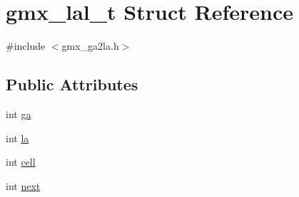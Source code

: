 \hypertarget{structgmx__lal__t}{\section{gmx\-\_\-lal\-\_\-t \-Struct \-Reference}
\label{structgmx__lal__t}
}


{\ttfamily \#include $<$gmx\-\_\-ga2la.\-h$>$}

\subsection*{\-Public \-Attributes}
\begin{DoxyCompactItemize}
\item 
int \hyperlink{structgmx__lal__t_ab71d344a09371c91d6f4513a27fd6dd6}{ga}
\item 
int \hyperlink{structgmx__lal__t_a5e7573b886bc78f23e02860b00da9dfe}{la}
\item 
int \hyperlink{structgmx__lal__t_a875850be535304b378d87e9ed3f82a27}{cell}
\item 
int \hyperlink{structgmx__lal__t_aa27b7ed8513370ab4c29a5425ee2e638}{next}
\end{DoxyCompactItemize}


